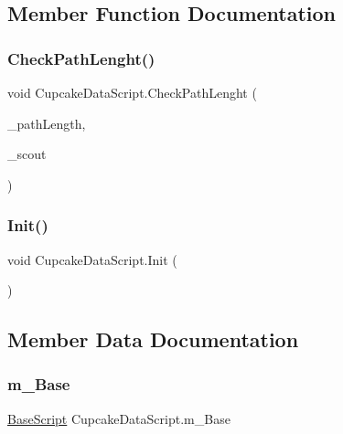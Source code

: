 \subsection{Member Function Documentation}
\mbox{\label{class_cupcake_data_script_a02d3a1c9ce68a8d02d6343e43e697436}} 
\subsubsection{\texorpdfstring{CheckPathLenght()}{CheckPathLenght()}}
{\footnotesize\ttfamily void Cupcake\+Data\+Script.\+Check\+Path\+Lenght (\begin{DoxyParamCaption}\item[{int}]{\+\_\+path\+Length,  }\item[{Game\+Object}]{\+\_\+scout }\end{DoxyParamCaption})}

\mbox{\label{class_cupcake_data_script_a891c6c00b3969f293c2896f34e1ad2c1}} 
\subsubsection{\texorpdfstring{Init()}{Init()}}
{\footnotesize\ttfamily void Cupcake\+Data\+Script.\+Init (\begin{DoxyParamCaption}{ }\end{DoxyParamCaption})}



\subsection{Member Data Documentation}
\mbox{\label{class_cupcake_data_script_a0362cf18940bafb31a5501f5b6f6698c}} 
\subsubsection{\texorpdfstring{m\_Base}{m\_Base}}
{\footnotesize\ttfamily \mbox{\hyperlink{class_base_script}{Base\+Script}} Cupcake\+Data\+Script.\+m\+\_\+\+Base}

